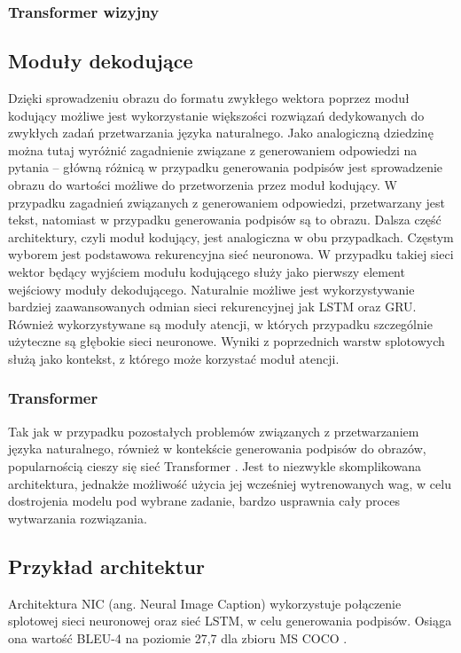 \subsubsection{Transformer wizyjny}
\subsection{Moduły dekodujące}
Dzięki sprowadzeniu obrazu do formatu zwykłego wektora poprzez moduł kodujący możliwe jest wykorzystanie większości rozwiązań dedykowanych do zwykłych zadań przetwarzania języka naturalnego. Jako analogiczną dziedzinę można tutaj wyróżnić zagadnienie związane z generowaniem odpowiedzi na pytania -- główną różnicą w przypadku generowania podpisów jest sprowadzenie obrazu do wartości możliwe do przetworzenia przez moduł kodujący. W przypadku zagadnień związanych z generowaniem odpowiedzi, przetwarzany jest tekst, natomiast w przypadku generowania podpisów są to obrazu. Dalsza część architektury, czyli moduł kodujący, jest analogiczna w obu przypadkach. Częstym wyborem jest podstawowa rekurencyjna sieć neuronowa. W przypadku takiej sieci wektor będący wyjściem modułu kodującego służy jako pierwszy element wejściowy moduły dekodującego. Naturalnie możliwe jest wykorzystywanie bardziej zaawansowanych odmian sieci rekurencyjnej jak LSTM oraz GRU. Również wykorzystywane są moduły atencji, w których przypadku szczególnie użyteczne są głębokie sieci neuronowe. Wyniki z poprzednich warstw splotowych służą jako kontekst, z którego może korzystać moduł atencji.
\subsubsection{Transformer}
Tak jak w przypadku pozostałych problemów związanych z przetwarzaniem języka naturalnego, również w kontekście generowania podpisów do obrazów, popularnością cieszy się sieć Transformer \cite{transformer}. Jest to niezwykle skomplikowana architektura, jednakże możliwość użycia jej wcześniej wytrenowanych wag, w celu dostrojenia modelu pod wybrane zadanie, bardzo usprawnia cały proces wytwarzania rozwiązania.
\subsection{Przykład architektur}
Architektura NIC (ang. Neural Image Caption) \cite{nic} wykorzystuje połączenie splotowej sieci neuronowej oraz sieć LSTM, w celu generowania podpisów. Osiąga ona wartość BLEU-4 na poziomie 27,7 dla zbioru MS COCO \cite{mscoco}.

